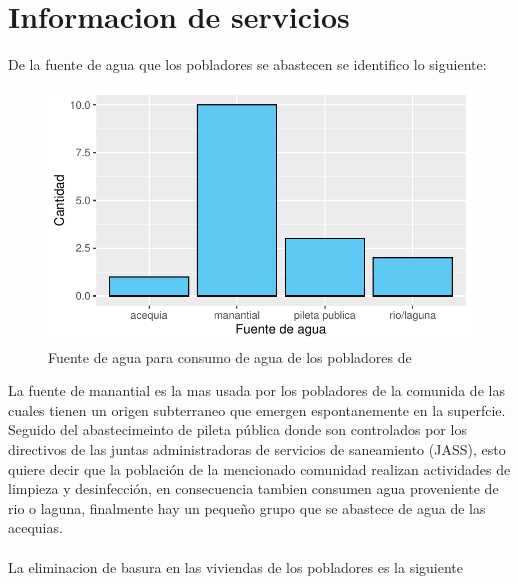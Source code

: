 \documentclass[12pt]{article}\usepackage[]{graphicx}\usepackage[]{xcolor}
\makeatletter
\def\maxwidth{ %
  \ifdim\Gin@nat@width>\linewidth
    \linewidth
  \else
    \Gin@nat@width
  \fi
}
\newenvironment{knitrout}{}{} %
\makeatother
\begin{document}
	\section{Informacion de servicios}
	De la fuente de agua que los pobladores se abastecen se identifico lo siguiente:
	\begin{figure}[H]
	\centering
\begin{knitrout}
\color{fgcolor}
\includegraphics[width=\maxwidth]{figure/seis-1} 
\end{knitrout}
	\caption{Fuente de agua para consumo de agua de los pobladores de \comunidad}
	\end{figure}
	La fuente de manantial es la mas usada por los pobladores de la comunida de \comunidad las cuales tienen un origen subterraneo que emergen espontanemente en la superfcie. Seguido del abastecimeinto de pileta pública donde son controlados por los directivos de las juntas administradoras de servicios de saneamiento (JASS), esto quiere decir que la población de la mencionado comunidad realizan actividades de limpieza y desinfección, en consecuencia tambien consumen agua proveniente de rio o laguna, finalmente hay un pequeño grupo que se abastece de agua de las acequias.\\
	\\
	La eliminacion de basura en las viviendas de los pobladores es la siguiente
\end{document}
